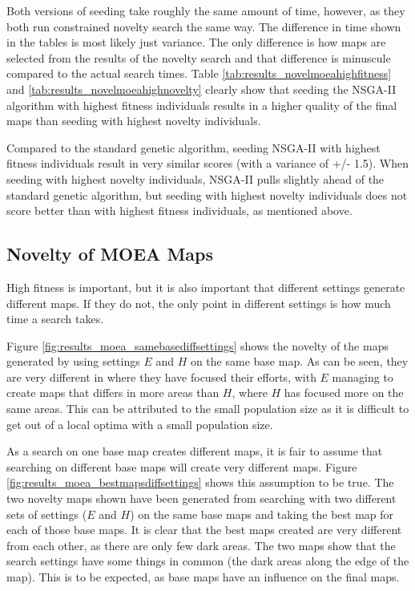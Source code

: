Both versions of seeding take roughly the same amount of time, however, as they both run constrained novelty search the same way. The difference in time shown in the tables is most likely just variance. The only difference is how maps are selected from the results of the novelty search and that difference is minuscule compared to the actual search times. Table \ref{tab:results_novelmoeahighfitness} and \ref{tab:results_novelmoeahighnovelty} clearly show that seeding the NSGA-II algorithm with highest fitness individuals results in a higher quality of the final maps than seeding with highest novelty individuals.

Compared to the standard genetic algorithm, seeding NSGA-II with highest fitness individuals result in very similar scores (with a variance of +/- 1.5). When seeding with highest novelty individuals, NSGA-II pulls slightly ahead of the standard genetic algorithm, but seeding with highest novelty individuals does not score better than with highest fitness individuals, as mentioned above.

\subsection*{Novelty of MOEA Maps}

High fitness is important, but it is also important that different settings generate different maps. If they do not, the only point in different settings is how much time a search takes.


Figure \ref{fig:results_moea_samebasediffsettings} shows the novelty of the maps generated by using settings $E$ and $H$ on the same base map. As can be seen, they are very different in where they have focused their efforts, with $E$ managing to create maps that differs in more areas than $H$, where $H$ has focused more on the same areas. This can be attributed to the small population size as it is difficult to get out of a local optima with a small population size.


As a search on one base map creates different maps, it is fair to assume that searching on different base maps will create very different maps. Figure \ref{fig:results_moea_bestmapsdiffsettings} shows this assumption to be true. The two novelty maps shown have been generated from searching with two different sets of settings ($E$ and $H$) on the same base maps and taking the best map for each of those base maps. It is clear that the best maps created are very different from each other, as there are only few dark areas. The two maps show that the search settings have some things in common (the dark areas along the edge of the map). This is to be expected, as base maps have an influence on the final maps.